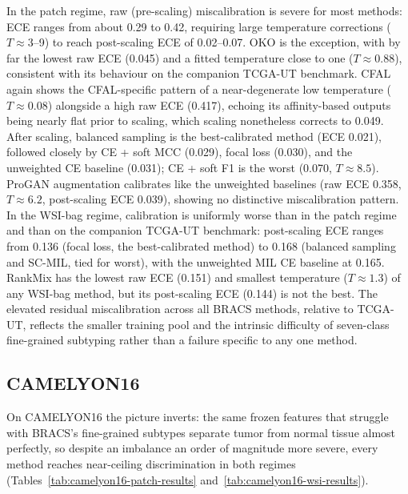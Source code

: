 \documentclass[11pt]{article}
\begin{document}
In the patch regime, raw (pre-scaling) miscalibration is severe for most methods: ECE ranges from about \num{0.29} to \num{0.42}, requiring large temperature corrections ($T \approx 3$--\num{9}) to reach post-scaling ECE of \num{0.02}--\num{0.07}. OKO is the exception, with by far the lowest raw ECE (\num{0.045}) and a fitted temperature close to one ($T\approx\num{0.88}$), consistent with its behaviour on the companion TCGA-UT benchmark. CFAL again shows the CFAL-specific pattern of a near-degenerate low temperature ($T\approx\num{0.08}$) alongside a high raw ECE (\num{0.417}), echoing its affinity-based outputs being nearly flat prior to scaling, which scaling nonetheless corrects to \num{0.049}. After scaling, balanced sampling is the best-calibrated method (ECE \num{0.021}), followed closely by CE + soft MCC (\num{0.029}), focal loss (\num{0.030}), and the unweighted CE baseline (\num{0.031}); CE + soft F1 is the worst (\num{0.070}, $T\approx\num{8.5}$). ProGAN augmentation calibrates like the unweighted baselines (raw ECE \num{0.358}, $T\approx\num{6.2}$, post-scaling ECE \num{0.039}), showing no distinctive miscalibration pattern. In the WSI-bag regime, calibration is uniformly worse than in the patch regime and than on the companion TCGA-UT benchmark: post-scaling ECE ranges from \num{0.136} (focal loss, the best-calibrated method) to \num{0.168} (balanced sampling and SC-MIL, tied for worst), with the unweighted MIL CE baseline at \num{0.165}. RankMix has the lowest raw ECE (\num{0.151}) and smallest temperature ($T\approx\num{1.3}$) of any WSI-bag method, but its post-scaling ECE (\num{0.144}) is not the best. The elevated residual miscalibration across all BRACS methods, relative to TCGA-UT, reflects the smaller training pool and the intrinsic difficulty of seven-class fine-grained subtyping rather than a failure specific to any one method.

\subsection{CAMELYON16}
On CAMELYON16 the picture inverts: the same frozen features that struggle with BRACS's fine-grained subtypes separate tumor from normal tissue almost perfectly, so despite an imbalance an order of magnitude more severe, every method reaches near-ceiling discrimination in both regimes (Tables~\ref{tab:camelyon16-patch-results} and~\ref{tab:camelyon16-wsi-results}).
\end{document}
